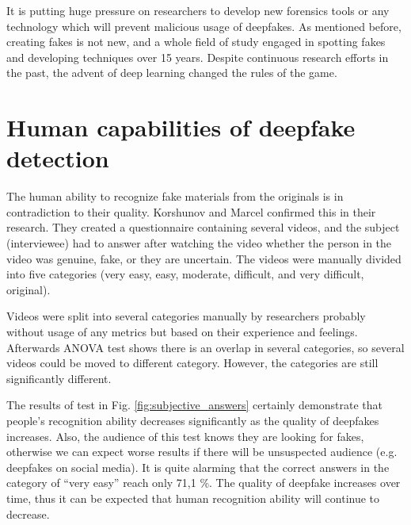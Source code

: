 It is putting huge pressure on researchers to develop new forensics tools or any technology which will prevent malicious usage of deepfakes. As mentioned before, creating fakes is not new, and a whole field of study engaged in spotting fakes and developing techniques over 15 years. Despite continuous research efforts in the past, the advent of deep learning changed the rules of the game. \cite{MediaForensicsandDeepFakes}

\section{Human capabilities of deepfake detection}

The human ability to recognize fake materials from the originals is in contradiction to their quality. Korshunov and Marcel confirmed this in their research. They created a questionnaire containing several videos, and the subject (interviewee) had to answer after watching the video whether the person in the video was genuine, fake, or they are uncertain. The videos were manually divided into five categories (very easy, easy, moderate, difficult, and very difficult, original). 

Videos were split into several categories manually by researchers probably without usage of any metrics but based on their experience and feelings. Afterwards ANOVA test shows there is an overlap in several categories, so several videos could be moved to different category. However, the categories are still significantly different. 

The results of test in Fig. \ref{fig:subjective_answers} certainly demonstrate that people's recognition ability decreases significantly as the quality of deepfakes increases. Also, the audience of this test knows they are looking for fakes, otherwise we can expect worse results if there will be unsuspected audience (e.g. deepfakes on social media). It is quite alarming that the correct answers in the category of “very easy” reach only 71,1 \%. The quality of deepfake increases over time, thus it can be expected that human recognition ability will continue to decrease. \cite{TheThreatOfDeepfakes}

